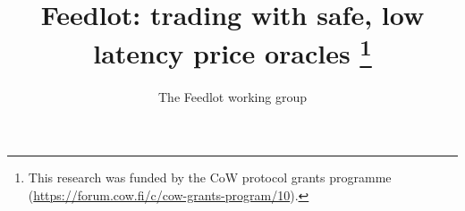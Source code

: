 %
%

\usepackage{titling}

\pretitle{
  \begin{flushleft} \Huge \sffamily \rule{\textwidth}{0.1ex}\vspace{1ex}}
\posttitle{ \rule{\textwidth}{0.1ex} \end{flushleft}}
\title{ Feedlot: trading with safe, low latency price oracles  \thanks{This research was funded by the CoW protocol grants programme (\url{https://forum.cow.fi/c/cow-grants-program/10}). }}

\preauthor{\begin{flushleft} \LARGE \sffamily \itshape}
\author{The Feedlot working group}
\postauthor{\end{flushleft}}

\date{}


\newcommand \printsplash {%
\noindent
  { \color {gray} \rule[-1ex]{0.5em}{7ex}\hspace{2em} }
  \begin{minipage}[b]{\textwidth - 4.7em}
    \onehalfspacing
    \emph{feed} --- Something supplied continuously.
    
    \emph{lot} --- One or more items auctioned or sold as a unit, separate from other items.
  \end{minipage}
  { \color {gray} \rule[-1ex]{0.2em}{7ex}\hspace{2em} }
  \vspace{4ex}
}
